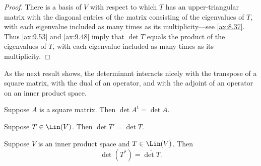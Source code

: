 \begin{proof}
There is a basis of $V$ with respect to which $T$ has an upper-triangular
matrix with the diagonal entries of the matrix consisting of the eigenvalues of
$T$, with each eigenvalue included as many times as its multiplicity---see
\ref{ax:8.37}. Thus \ref{ax:9.53} and \ref{ax:9.48} imply that $\det T$ equals
the product of the eigenvalues of $T$, with each eigenvalue included as many
times as its multiplicity.
\end{proof}

As the next result shows, the determinant interacts nicely with the transpose
of a square matrix, with the dual of an operator, and with the adjoint of an
operator on an inner product space.

\begin{result}\label{ax:9.56}\leavevmode
\begin{parts}
\item Suppose $A$ is a square matrix. Then $\det A^{\mathrm{t}}=\det A$.
\item Suppose $T\in\Lin(V)$. Then $\det T'=\det T$.
\item Suppose $V$ is an inner product space and $T\in\Lin(V)$. Then
  \[ \det(T^*) = \overline{\det T}. \]
\end{parts}
\end{result}

